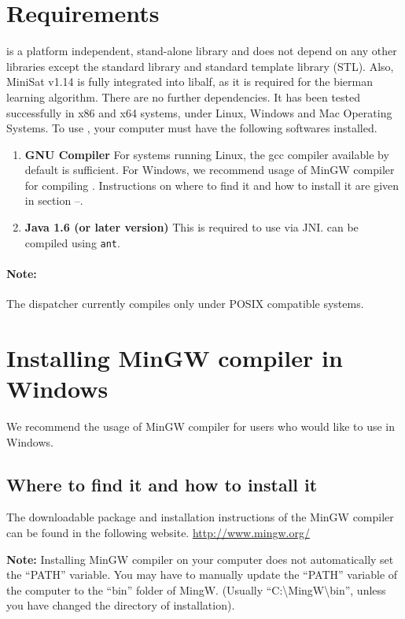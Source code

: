 \section{Requirements}
\libalf is a platform independent, stand-alone \cpp library and does not depend on any other libraries except the \cpp standard library and standard template library (STL). Also, MiniSat v1.14 is fully integrated into libalf, as it is required for the bierman learning algorithm. There are no further dependencies. It has been tested successfully in x86 and x64 systems, under Linux, Windows and Mac Operating Systems. To use \libalf, your computer must have the following softwares installed.
\begin{enumerate}
 \item \textbf{GNU Compiler} \vskip 1pt
	For systems running Linux, the gcc compiler available by default is sufficient. \vskip 1pt
	For Windows, we recommend usage of MinGW compiler for compiling \libalf. Instructions on where to find it and how to install it are given in section --.
 \item \textbf{Java 1.6 (or later version)} \vskip 1pt
	This is required to use \libalf via JNI. \jalf can be compiled using \texttt{ant}.
\end{enumerate}
\paragraph{Note:}
The dispatcher currently compiles only under POSIX compatible systems. 

\section*{Installing MinGW compiler in Windows}
We recommend the usage of MinGW compiler for users who would like to use \libalf in Windows. 

\subsection*{Where to find it and how to install it}
The downloadable package and installation instructions of the MinGW compiler can be found in the following website.
\url{http://www.mingw.org/} \vskip 1pt

\textbf{Note:} Installing MinGW compiler on your computer does not automatically set the ``PATH'' variable. You may have to manually update the ``PATH'' variable of the computer to the ``bin'' folder of MingW. (Usually ``C:\textbackslash MingW\textbackslash bin'', unless you have changed the directory of installation). 

